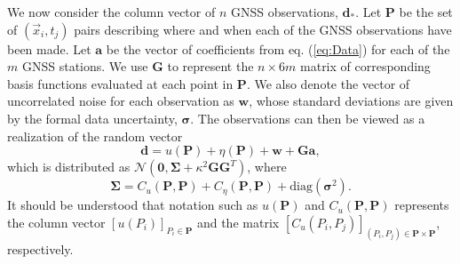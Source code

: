 \documentclass[10pt,letter]{article}
\begin{document}
We now consider the column vector of $n$ GNSS observations, $\bm{d}_*$. Let $\bm{P}$ be the set of $(\vec{x}_i, t_j)$ pairs describing where and when each of the GNSS observations have been made. Let $\bm{a}$ be the vector of coefficients from eq. (\ref{eq:Data}) for each of the $m$ GNSS stations. We use $\bm{G}$ to represent the $n \times 6m$ matrix of corresponding basis functions evaluated at each point in $\bm{P}$. We  also denote the vector of uncorrelated noise for each observation as $\bm{w}$, whose standard deviations are given by the formal data uncertainty, $\bm{\sigma}$. The observations can then be viewed as a realization of the random vector
\begin{equation}
\bm{d} = u(\bm{P}) + \eta(\bm{P}) + \bm{w} + \bm{G}\bm{a},
\end{equation}
which is distributed as $\mathcal{N}(\bm{0},\bm{\Sigma} + \kappa^2\bm{G}\bm{G}^T)$, where
\begin{equation}\label{eq:Cd}
\bm{\Sigma} = C_u(\bm{P},\bm{P}) + C_\eta(\bm{P},\bm{P}) + 
              \mathrm{diag}\left(\bm{\sigma}^2\right).  
\end{equation}
It should be understood that notation such as $u(\bm{P})$ and $C_u(\bm{P},\bm{P})$ represents the column vector $[u(P_i)]_{P_i \in \bm{P}}$ and the matrix $[C_u(P_i,P_j)]_{(P_i,P_j) \in \bm{P} \times \bm{P}}$, respectively. 
\end{document}
